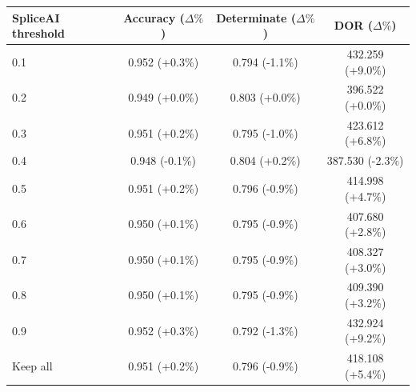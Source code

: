 \begin{tabular}{lccc}
\toprule
SpliceAI threshold & Accuracy ($\Delta\%$) & Determinate ($\Delta\%$) & DOR ($\Delta\%$) \\
\midrule
0.1 & 0.952 (+0.3\%) & 0.794 (-1.1\%) & 432.259 (+9.0\%) \\
0.2 & 0.949 (+0.0\%) & 0.803 (+0.0\%) & 396.522 (+0.0\%) \\
0.3 & 0.951 (+0.2\%) & 0.795 (-1.0\%) & 423.612 (+6.8\%) \\
0.4 & 0.948 (-0.1\%) & 0.804 (+0.2\%) & 387.530 (-2.3\%) \\
0.5 & 0.951 (+0.2\%) & 0.796 (-0.9\%) & 414.998 (+4.7\%) \\
0.6 & 0.950 (+0.1\%) & 0.795 (-0.9\%) & 407.680 (+2.8\%) \\
0.7 & 0.950 (+0.1\%) & 0.795 (-0.9\%) & 408.327 (+3.0\%) \\
0.8 & 0.950 (+0.1\%) & 0.795 (-0.9\%) & 409.390 (+3.2\%) \\
0.9 & 0.952 (+0.3\%) & 0.792 (-1.3\%) & 432.924 (+9.2\%) \\
Keep all & 0.951 (+0.2\%) & 0.796 (-0.9\%) & 418.108 (+5.4\%) \\
\bottomrule
\end{tabular}
